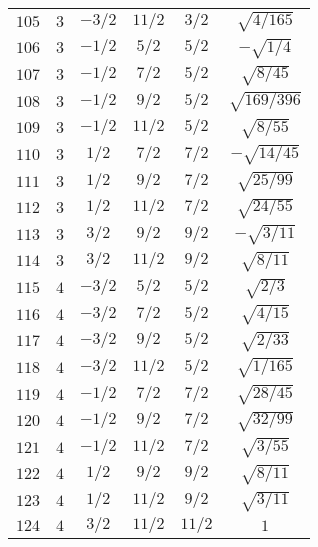 \begin{table}
\begin{center}
\begin{tabular}{|c|c|c|c|c|c|}
$105$ & $3$ & $-3/2$ & $11/2$ & $3/2$ & $\sqrt{4/165}$ \\ 
$106$ & $3$ & $-1/2$ & $5/2$ & $5/2$ & $-\sqrt{1/4}$ \\ 
$107$ & $3$ & $-1/2$ & $7/2$ & $5/2$ & $\sqrt{8/45}$ \\ 
$108$ & $3$ & $-1/2$ & $9/2$ & $5/2$ & $\sqrt{169/396}$ \\ 
$109$ & $3$ & $-1/2$ & $11/2$ & $5/2$ & $\sqrt{8/55}$ \\ 
$110$ & $3$ & $1/2$ & $7/2$ & $7/2$ & $-\sqrt{14/45}$ \\ 
$111$ & $3$ & $1/2$ & $9/2$ & $7/2$ & $\sqrt{25/99}$ \\ 
$112$ & $3$ & $1/2$ & $11/2$ & $7/2$ & $\sqrt{24/55}$ \\ 
$113$ & $3$ & $3/2$ & $9/2$ & $9/2$ & $-\sqrt{3/11}$ \\ 
$114$ & $3$ & $3/2$ & $11/2$ & $9/2$ & $\sqrt{8/11}$ \\ 
$115$ & $4$ & $-3/2$ & $5/2$ & $5/2$ & $\sqrt{2/3}$ \\ 
$116$ & $4$ & $-3/2$ & $7/2$ & $5/2$ & $\sqrt{4/15}$ \\ 
$117$ & $4$ & $-3/2$ & $9/2$ & $5/2$ & $\sqrt{2/33}$ \\ 
$118$ & $4$ & $-3/2$ & $11/2$ & $5/2$ & $\sqrt{1/165}$ \\ 
$119$ & $4$ & $-1/2$ & $7/2$ & $7/2$ & $\sqrt{28/45}$ \\ 
$120$ & $4$ & $-1/2$ & $9/2$ & $7/2$ & $\sqrt{32/99}$ \\ 
$121$ & $4$ & $-1/2$ & $11/2$ & $7/2$ & $\sqrt{3/55}$ \\ 
$122$ & $4$ & $1/2$ & $9/2$ & $9/2$ & $\sqrt{8/11}$ \\ 
$123$ & $4$ & $1/2$ & $11/2$ & $9/2$ & $\sqrt{3/11}$ \\ 
$124$ & $4$ & $3/2$ & $11/2$ & $11/2$ & $1$ \\ 
\hline 
\end{tabular}
\end{center}
\end{table}

